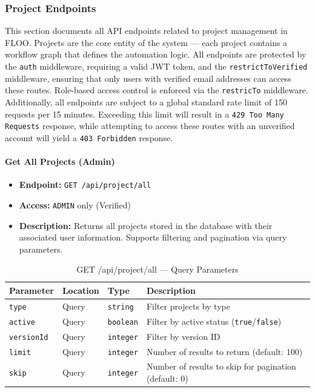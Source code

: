 \subsubsection{Project Endpoints}
\label{subsec:project-endpoints}

This section documents all API endpoints related to project management in FLOO.
Projects are the core entity of the system — each project contains a workflow graph
that defines the automation logic.
All endpoints are protected by the \texttt{auth} middleware, requiring a valid JWT token, and the \texttt{restrictToVerified} middleware, ensuring that only users with verified email addresses can access these routes.
Role-based access control is enforced via the \texttt{restricTo} middleware.
Additionally, all endpoints are subject to a global standard rate limit of 150 requests per 15 minutes.
Exceeding this limit will result in a \texttt{429 Too Many Requests} response, while attempting to access these routes with an unverified account will yield a \texttt{403 Forbidden} response.

\paragraph{Get All Projects (Admin)}
\label{subsubsec:get-all-projects}

\begin{itemize}
  \item \textbf{Endpoint:} \texttt{GET /api/project/all}
  \item \textbf{Access:} \texttt{ADMIN} only (Verified)
  \item \textbf{Description:} Returns all projects stored in the database with their
  associated user information. Supports filtering and pagination via query parameters.
\end{itemize}

\begin{table}[H]
\centering
\renewcommand{\arraystretch}{1.3}
\begin{tabularx}{\textwidth}{|l|l|l|X|}
\hline
\textbf{Parameter} & \textbf{Location} & \textbf{Type} & \textbf{Description} \\
\hline
\texttt{type}      & Query & \texttt{string}  & Filter projects by type \\
\hline
\texttt{active}    & Query & \texttt{boolean} & Filter by active status (\texttt{true}/\texttt{false}) \\
\hline
\texttt{versionId} & Query & \texttt{integer} & Filter by version ID \\
\hline
\texttt{limit}     & Query & \texttt{integer} & Number of results to return (default: 100) \\
\hline
\texttt{skip}      & Query & \texttt{integer} & Number of results to skip for pagination (default: 0) \\
\hline
\end{tabularx}
\caption{GET /api/project/all — Query Parameters}
\label{tab:get-all-projects-params}
\end{table}

